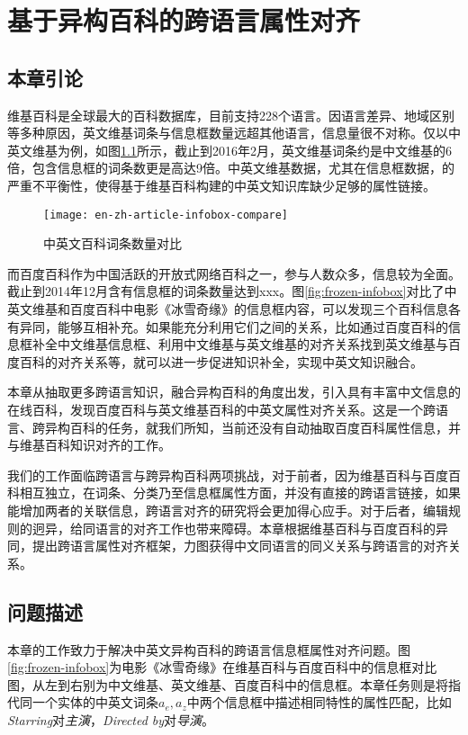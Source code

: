 \chapter{基于异构百科的跨语言属性对齐}
\label{cha:property-matching}

\section{本章引论}
维基百科是全球最大的百科数据库，目前支持228个语言。因语言差异、地域区别等多种原因，英文维基词条与信息框数量远超其他语言，信息量很不对称。仅以中英文维基为例，如图\ref{fig:en-zh-article-infobox-compare}所示，截止到2016年2月，英文维基词条约是中文维基的6倍，包含信息框的词条数更是高达9倍。中英文维基数据，尤其在信息框数据，的严重不平衡性，使得基于维基百科构建的中英文知识库缺少足够的属性链接。

\begin{figure}[h]
  \centering
  \texttt{[image: en-zh-article-infobox-compare]}
  \caption{中英文百科词条数量对比}
  \label{fig:en-zh-article-infobox-compare}
\end{figure}


而百度百科作为中国活跃的开放式网络百科之一，参与人数众多，信息较为全面。截止到2014年12月含有信息框的词条数量达到xxx。图\ref{fig:frozen-infobox}对比了中英文维基和百度百科中电影《冰雪奇缘》的信息框内容，可以发现三个百科信息各有异同，能够互相补充。如果能充分利用它们之间的关系，比如通过百度百科的信息框补全中文维基信息框、利用中文维基与英文维基的对齐关系找到英文维基与百度百科的对齐关系等，就可以进一步促进知识补全，实现中英文知识融合。

本章从抽取更多跨语言知识，融合异构百科的角度出发，引入具有丰富中文信息的在线百科，发现百度百科与英文维基百科的中英文属性对齐关系。这是一个跨语言、跨异构百科的任务，就我们所知，当前还没有自动抽取百度百科属性信息，并与维基百科知识对齐的工作。

我们的工作面临跨语言与跨异构百科两项挑战，对于前者，因为维基百科与百度百科相互独立，在词条、分类乃至信息框属性方面，并没有直接的跨语言链接，如果能增加两者的关联信息，跨语言对齐的研究将会更加得心应手。对于后者，编辑规则的迥异，给同语言的对齐工作也带来障碍。本章根据维基百科与百度百科的异同，提出跨语言属性对齐框架，力图获得中文同语言的同义关系与跨语言的对齐关系。


\section{问题描述}
本章的工作致力于解决中英文异构百科的跨语言信息框属性对齐问题。图\ref{fig:frozen-infobox}为电影《冰雪奇缘》在维基百科与百度百科中的信息框对比图，从左到右别为中文维基、英文维基、百度百科中的信息框。本章任务则是将指代同一个实体的中英文词条$a_e,a_z$中两个信息框中描述相同特性的属性匹配，比如\textit{Starring}对\textit{主演}，\textit{Directed by}对\textit{导演}。

